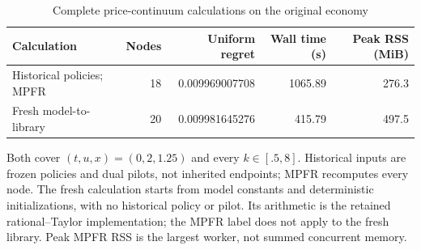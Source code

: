 \begin{table}[htbp]\centering\small
\caption{Complete price-continuum calculations on the original economy}\label{tab:r16price}
\begin{tabular}{lrrrr}
\toprule
Calculation & Nodes & Uniform regret & Wall time (s) & Peak RSS (MiB)\\\midrule
Historical policies; MPFR & 18 & 0.009969007708 & 1065.89 & 276.3\\
Fresh model-to-library & 20 & 0.009981645276 & 415.79 & 497.5\\
\bottomrule\end{tabular}
\par\smallskip\footnotesize Both cover $(t,u,x)=(0,2,1.25)$ and every $k\in[.5,8]$. Historical inputs are frozen policies and dual pilots, not inherited endpoints; MPFR recomputes every node. The fresh calculation starts from model constants and deterministic initializations, with no historical policy or pilot. Its arithmetic is the retained rational--Taylor implementation; the MPFR label does not apply to the fresh library. Peak MPFR RSS is the largest worker, not summed concurrent memory.
\end{table}
